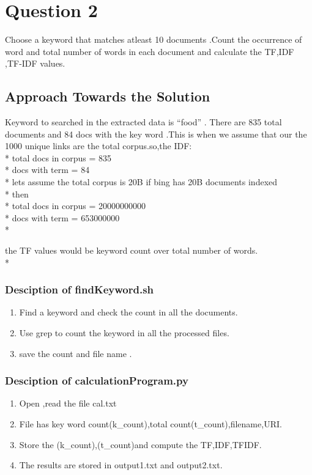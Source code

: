 \documentclass[12pt]{article}
\begin{document}
\section{Question 2}
Choose a keyword that matches atleast 10 documents .Count the occurrence of word and total number of words in each document and calculate the TF,IDF ,TF-IDF values.
\subsection{Approach Towards the Solution}
Keyword to searched in the extracted data is ``food'' . There are 835 total documents and 84 docs with the key word .This is when we assume that our the 1000 unique links are the total corpus.so,the IDF:\\*
 total docs in corpus = 835 \\*
 docs with term       = 84 \\*
lets assume the total corpus is 20B if bing has 20B documents indexed \\*
then \\*
 total docs in corpus = 20000000000 \\*
 docs with term       = 653000000 \\*
 
the TF values would be keyword count over total number of words.\\*

\subsubsection{Desciption of findKeyword.sh}
\begin{enumerate}
	\item Find a keyword and check the count in all the documents.
	\item Use  grep to count the keyword in all the processed files.
	\item save the count and file name .
\end{enumerate}

\subsubsection{Desciption of calculationProgram.py}
\begin{enumerate}
	\item Open ,read the file cal.txt
	\item File has key word count(k\_count),total count(t\_count),filename,URI.
	\item Store the (k\_count),(t\_count)and compute the TF,IDF,TFIDF.
	\item The results are stored in output1.txt and output2.txt.
\end{enumerate}
\newpage
\end{document}
